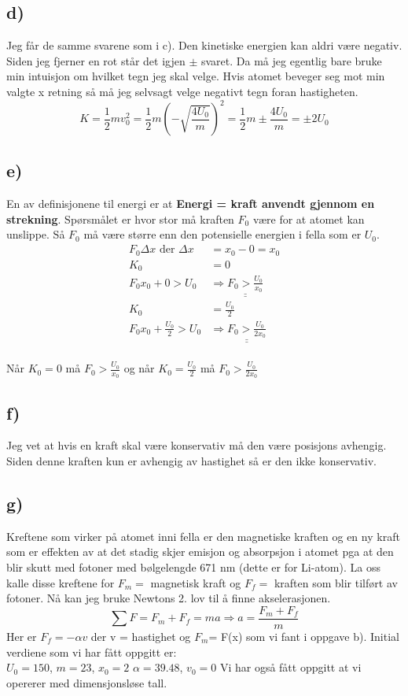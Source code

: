 \documentclass[a4paper,12pt,norsk]{article}
\begin{document}
\subsection*{d)}
Jeg får de samme svarene som i c). Den kinetiske energien kan aldri være negativ. Siden jeg fjerner en rot står det igjen $\pm$ svaret. Da må jeg egentlig bare bruke min intuisjon om hvilket tegn jeg skal velge. Hvis atomet beveger seg mot min valgte x retning så må jeg selvsagt velge negativt tegn foran hastigheten.
$$K = \frac{1}{2}mv_0^2 =  \frac{1}{2}m\left(-\sqrt{\frac{4U_0}{m}}\right)^2 = \frac{1}{2}m\pm\frac{4U_0}{m} =\pm 2U_0$$

\subsection*{e)}
En av definisjonene til energi er at \textbf{Energi = kraft anvendt gjennom en strekning}. Spørsmålet er hvor stor må kraften $F_0$ være for at atomet kan unslippe. Så $F_0$ må være større enn den potensielle energien i fella som er $U_0$. 
\begin{align*}
F_0\Delta{x} \textrm{ der }\Delta{x} &= x_0 - 0 = x_0\\
K_0 &= 0\\
F_0x_0 + 0 > U_0 &\Rightarrow \underline{\underline{F_0 > \frac{U_0}{x_0}}}\\
K_0 &= \frac{U_0}{2}\\
F_0x_0 +  \frac{U_0}{2} > U_0 &\Rightarrow \underline{\underline{F_0 > \frac{U_0}{2x_0}}}
\end{align*}\\
Når $K_0 = 0$ må $F_0 > \frac{U_0}{x_0}$ og når $K_0 = \frac{U_0}{2}$ må $F_0 > \frac{U_0}{2x_0}$

\subsection*{f)}
Jeg vet at hvis en kraft skal være konservativ må den være posisjons avhengig. Siden denne kraften kun er avhengig av hastighet så er den ikke konservativ.

\subsection*{g)}
Kreftene som virker på atomet inni fella er den magnetiske kraften og en ny kraft som er effekten av at det stadig skjer emisjon og absorpsjon i atomet pga at den blir skutt med fotoner med bølgelengde 671 nm (dette er for Li-atom).  La oss kalle disse kreftene for $F_m =$ magnetisk kraft og $F_f =$ kraften som blir tilført av fotoner. Nå kan jeg bruke Newtons 2. lov til å finne akselerasjonen. 
$$\sum{F} = F_m +F_f = ma \Rightarrow a = \frac{F_m +F_f}{m}$$
Her er $F_f = -\alpha v$ der v = hastighet og $F_m $= F(x) som vi fant i oppgave b).
Initial verdiene som vi har fått oppgitt er:\\
$U_0 = 150$, $m = 23$, $x_0=2$ $\alpha = 39.48$, $v_0 = 0$ Vi har også fått oppgitt at vi opererer med dimensjonsløse tall.  
\end{document}
